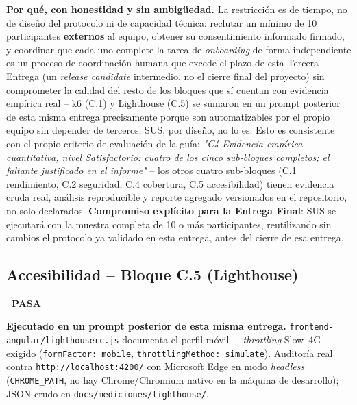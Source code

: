 \documentclass[12pt,a4paper]{article}
\newcommand{\estadoPasa}{\colorbox{verdelight}{\color{white}\small\bfseries\ PASA\ }}
\begin{document}
\label{sec:proteccion-c3}
\textbf{Por qué, con honestidad y sin ambigüedad.} La restricción es de
tiempo, no de diseño del protocolo ni de capacidad técnica: reclutar un
mínimo de 10 participantes \textbf{externos} al equipo, obtener su
consentimiento informado firmado, y coordinar que cada uno complete la
tarea de \emph{onboarding} de forma independiente es un proceso de
coordinación humana que excede el plazo de esta Tercera Entrega (un
\emph{release candidate} intermedio, no el cierre final del proyecto) sin
comprometer la calidad del resto de los bloques que sí cuentan con
evidencia empírica real -- k6 (C.1) y Lighthouse (C.5) se sumaron en un
prompt posterior de esta misma entrega precisamente porque son
automatizables por el propio equipo sin depender de terceros; SUS, por
diseño, no lo es. Esto es consistente con el propio criterio de
evaluación de la guía: \emph{"C4 Evidencia empírica cuantitativa, nivel
Satisfactorio: cuatro de los cinco sub-bloques completos; el faltante
justificado en el informe"} -- los otros cuatro sub-bloques (C.1
rendimiento, C.2 seguridad, C.4 cobertura, C.5 accesibilidad) tienen
evidencia cruda real, análisis reproducible y reporte agregado
versionados en el repositorio, no solo declarados. \textbf{Compromiso
explícito para la Entrega Final}: SUS se ejecutará con la muestra
completa de 10 o más participantes, reutilizando sin cambios el protocolo
ya validado en esta entrega, antes del cierre de esa entrega.

\subsection{Accesibilidad -- Bloque C.5 (Lighthouse)}

\estadoPasa

\textbf{Ejecutado en un prompt posterior de esta misma entrega.}
\texttt{frontend-angular/lighthouserc.js} documenta el perfil móvil +
\emph{throttling} Slow~4G exigido (\texttt{formFactor: mobile},
\texttt{throttlingMethod: simulate}). Auditoría real contra
\texttt{http://localhost:4200/} con Microsoft Edge en modo \emph{headless}
(\texttt{CHROME\_PATH}, no hay Chrome/Chromium nativo en la máquina de
desarrollo); JSON crudo en \texttt{docs/mediciones/lighthouse/}.
\end{document}
